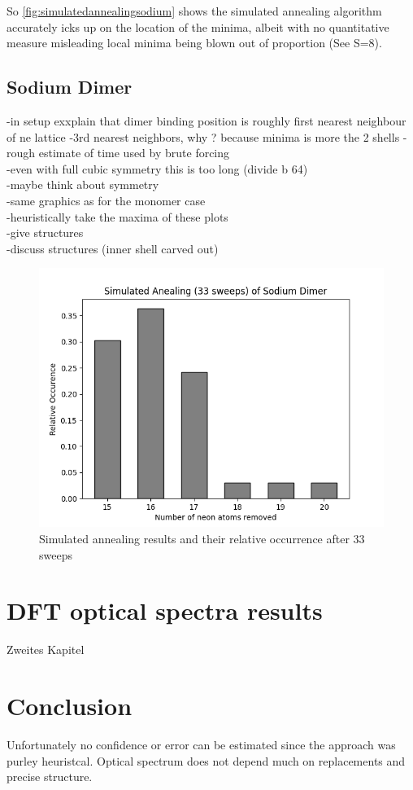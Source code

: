 So \ref{fig:simulatedannealingsodium} shows the simulated annealing algorithm accurately icks up on the location of the minima, albeit with no quantitative measure misleading local minima being blown out of proportion (See S=8).

\section{Sodium Dimer}
-in setup exxplain that dimer binding position is roughly first nearest neighbour of  ne lattice
-3rd nearest neighbors, why ? because minima is more the 2 shells
-rough estimate of time used by brute forcing\\
-even with full cubic symmetry this is too long (divide b 64)\\
-maybe think about symmetry\\
-same graphics as for the monomer case\\
-heuristically take the maxima of these plots \\
-give structures\\
-discuss structures (inner shell carved out)\\

\begin{figure}
	\centering
	\includegraphics[scale = 0.5]{Inhalt/Bilder/optimal_defect_simulated_annealing_dimer.png}
	\caption{Simulated annealing results and their relative occurrence after 33 sweeps}
	\label{fig:simulatedannealingsodiumdimer}
\end{figure}

\chapter{DFT optical spectra results}
\label{chap:Zweites Kapitel}
%
Zweites Kapitel
%
%
\chapter{Conclusion}
Unfortunately no confidence or error can be estimated since the approach was purley heuristcal. Optical spectrum does not depend much on replacements and precise structure.



